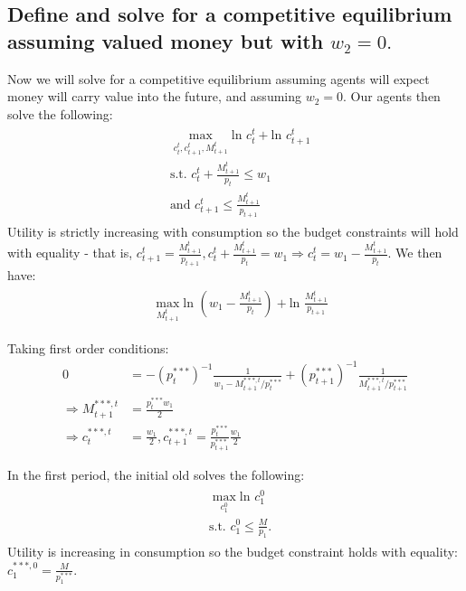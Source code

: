 \documentclass[11pt]{article} %
\begin{document}
\subsection{Define and solve for a competitive equilibrium assuming valued money but with $w_2 = 0.$}
Now we will solve for a competitive equilibrium assuming agents will expect money will carry value into the future, and assuming $w_2 = 0.$ Our agents then solve the following:
\begin{align*}
\begin{split}
&\max_{c_{t}^{t},c_{t+1}^{t},M_{t+1}^t} \text{ln } c_{t}^{t} + \text{ln } c_{t+1}^{t}\\  
&\text{s.t. } c_{t}^{t} + \frac{M_{t+1}^{t}}{p_t} \leq w_1 \\
&\text{and }  c_{t+1}^{t} \leq \frac{M_{t+1}^{t}}{p_{t+1}}
\end{split}
\end{align*}
Utility is strictly increasing with consumption so the budget constraints will hold with equality - that is, $c_{t+1}^{t} = \frac{M_{t+1}^{t}}{p_{t+1}}, c_{t}^{t} + \frac{M_{t+1}^{t}}{p_t} = w_1 \Rightarrow c_{t}^{t} = w_1 - \frac{M_{t+1}^{t}}{p_t}  $. We then have:
\begin{align*}
\begin{split}
&\max_{M_{t+1}^t} \text{ln } \left(w_1 - \frac{M_{t+1}^{t}}{p_t}\right) + \text{ln } \frac{M_{t+1}^{t}}{p_{t+1}}
\end{split}
\end{align*}

Taking first order conditions:
\begin{align*}
0 &= -(p_t^{***})^{-1}\frac{1}{w_1 - M_{t+1}^{***,t} / p_t^{***}} + (p_{t+1}^{***})^{-1}\frac{1}{M_{t+1}^{***,t}/p_{t+1}^{***}}\\
\Rightarrow  M_{t+1}^{***,t} &= \frac{p_t^{***} w_1}{2}\\
\Rightarrow c_t^{***,t} &= \frac{w_1}{2}, c_{t+1}^{***,t} = \frac{p_t^{***}}{p_{t+1}^{***}}\frac{w_1}{2}
\end{align*}

In the first period, the initial old solves the following:
\begin{align*}
\begin{split}
&\max_{c_{1}^{0}} \text{ln } c_{1}^{0}\\ 
&\text{s.t. } c_{1}^{0} \leq \frac{M}{p_1}.
\end{split}
\end{align*}
Utility is increasing in consumption so the budget constraint holds with equality: $c_{1}^{***,0} = \frac{M}{p_1^{***}}$.
\end{document}
